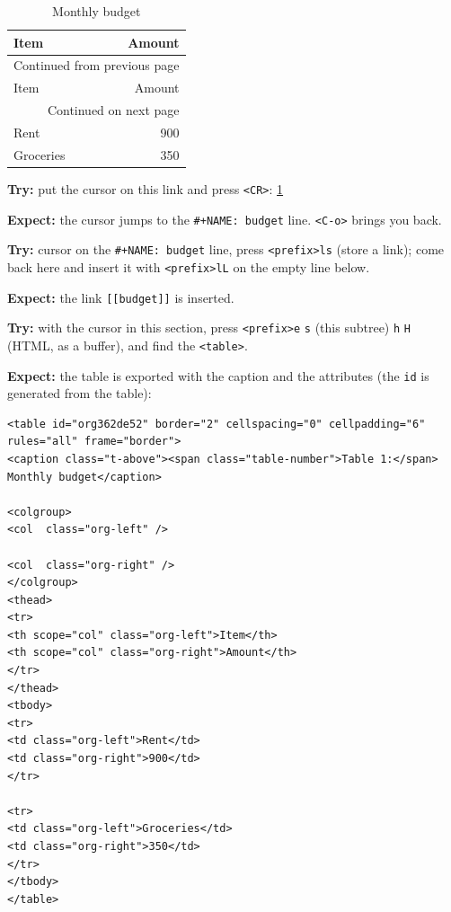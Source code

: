 \begin{longtable}{l|r}
\caption{\label{tab:org53d342f}Monthly budget}
\\
Item & Amount\\
\hline
\endfirsthead
\multicolumn{2}{l}{Continued from previous page} \\
\hline

Item & Amount \\

\hline
\endhead
\hline\multicolumn{2}{r}{Continued on next page} \\
\endfoot
\endlastfoot
\hline
Rent & 900\\
Groceries & 350\\
\end{longtable}

\textbf{Try:} put the cursor on this link and press \texttt{<CR>}: \ref{tab:org53d342f}

\textbf{Expect:} the cursor jumps to the \texttt{\#+NAME: budget} line. \texttt{<C-o>} brings
you back.

\textbf{Try:} cursor on the \texttt{\#+NAME: budget} line, press \texttt{<prefix>ls} (store a
link); come back here and insert it with \texttt{<prefix>lL} on the empty line
below.

\textbf{Expect:} the link \texttt{[[budget]]} is inserted.

\textbf{Try:} with the cursor in this section, press \texttt{<prefix>e} \texttt{s} (this
subtree) \texttt{h} \texttt{H} (HTML, as a buffer), and find the \texttt{<table>}.

\textbf{Expect:} the table is exported with the caption and the attributes (the
\texttt{id} is generated from the table):
\begin{verbatim}
<table id="org362de52" border="2" cellspacing="0" cellpadding="6" rules="all" frame="border">
<caption class="t-above"><span class="table-number">Table 1:</span> Monthly budget</caption>

<colgroup>
<col  class="org-left" />

<col  class="org-right" />
</colgroup>
<thead>
<tr>
<th scope="col" class="org-left">Item</th>
<th scope="col" class="org-right">Amount</th>
</tr>
</thead>
<tbody>
<tr>
<td class="org-left">Rent</td>
<td class="org-right">900</td>
</tr>

<tr>
<td class="org-left">Groceries</td>
<td class="org-right">350</td>
</tr>
</tbody>
</table>
\end{verbatim}

